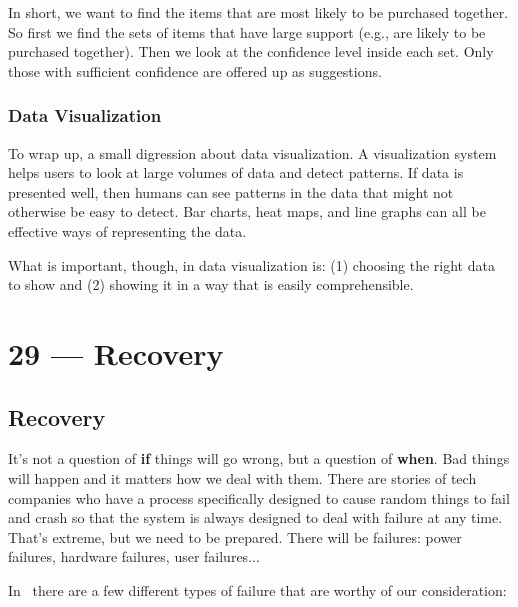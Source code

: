 \documentclass[a4paper]{report}
\begin{document}
In short, we want to find the items that are most likely to be purchased together. So first we find the sets of items that have large support (e.g., are likely to be purchased together). Then we look at the confidence level inside each set. Only those with sufficient confidence are offered up as suggestions. 

\subsection*{Data Visualization}

To wrap up, a small digression about data visualization. A visualization system helps users to look at large volumes of data and detect patterns. If data is presented well, then humans can see patterns in the data that might not otherwise be easy to detect. Bar charts, heat maps, and line graphs can all be effective ways of representing the data.

What is important, though, in data visualization is: (1) choosing the right data to show and (2) showing it in a way that is easily comprehensible. 










\chapter*{29 --- Recovery}


\section*{Recovery}

It's not a question of \textbf{if} things will go wrong, but a question of \textbf{when}. Bad things will happen and it matters how we deal with them. There are stories of tech companies who have a process specifically designed to cause random things to fail and crash so that the system is always designed to deal with failure at any time. That's extreme, but we need to be prepared. There will be failures: power failures, hardware failures, user failures...

In~\cite{dsc} there are a few different types of failure that are worthy of our consideration:
\end{document}
